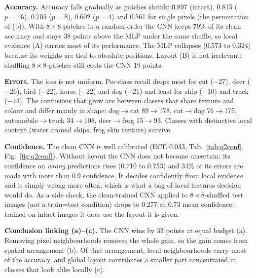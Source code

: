 \textbf{Accuracy.} Accuracy falls gradually as patches shrink: 0.897 (intact), 0.815 ($p=16$), 0.705 ($p=8$),
0.602 ($p=4$) and 0.561 for single pixels (the permutation of (b)). With $8\times8$ patches in a random order the
CNN keeps 79\% of its clean accuracy and stays 38 points above the MLP under the same shuffle, so local evidence
(A) carries most of its performance. The MLP collapses (0.573 to 0.324) because its weights are tied to absolute
positions. Layout (B) is not irrelevant: shuffling $8\times8$ patches still costs the CNN 19 points.

\textbf{Errors.} The loss is not uniform. Per-class recall drops most for cat ($-27$), deer ($-26$), bird
($-22$), horse ($-22$) and dog ($-21$) and least for ship ($-10$) and truck ($-14$). The confusions that grow are
between classes that share texture and colour and differ mainly in shape: dog$\to$cat 89$\to$178,
cat$\to$dog 76$\to$175, automobile$\to$truck 34$\to$108, deer$\to$frog 15$\to$93. Classes with distinctive
local context (water around ships, frog skin texture) survive.

\textbf{Confidence.} The clean CNN is well calibrated (ECE 0.033, Tab.~\ref{tab:q2conf}, Fig.~\ref{fig:q2conf}).
Without layout the CNN does not become uncertain: its confidence on \emph{wrong} predictions rises (0.710 to
0.753) and 34\% of its errors are made with more than 0.9 confidence. It decides confidently from local evidence
and is simply wrong more often, which is what a bag-of-local-features decision would do. As a side check, the
clean-trained CNN applied to $8\times8$-shuffled test images (not a train=test condition) drops to 0.277 at 0.73
mean confidence: trained on intact images it does use the layout it is given.

\textbf{Conclusion linking (a)--(c).} The CNN wins by 32 points at equal budget (a). Removing pixel
neighbourhoods removes the whole gain, so the gain comes from spatial arrangement (b). Of that arrangement, local
neighbourhoods carry most of the accuracy, and global layout contributes a smaller part concentrated in classes
that look alike locally (c).
